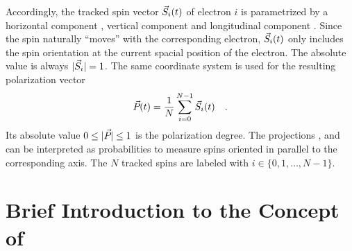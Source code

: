 \documentclass[a4paper]{scrartcl}
\begin{document}
Accordingly, the tracked spin vector $\svec[i](t)$ of electron $i$ is parametrized by a horizontal
component \sx, vertical component \sz and longitudinal component \slong. Since the spin
naturally \enquote{moves} with the corresponding electron, $\svec[i](t)$ only
includes the spin orientation at the current spacial position of the electron. The
absolute value is always $|\svec[i]| = 1$.
%
The same coordinate system is used for the resulting polarization vector
\begin{equation*}
\pvec(t) = \frac{1}{N} \sum_{i=0}^{N-1} \svec[i](t) \quad.
\end{equation*}
Its absolute value $0\leq\pabs\leq 1$ is the polarization degree. The projections \px, \pz
and \plong can be interpreted as probabilities to measure spins oriented in parallel to
the corresponding axis.
%
The $N$ tracked spins are labeled with $i\in \{0,1,\dots,N-1\}$.




\section{Brief Introduction to the Concept of \polem}
\label{sec:brief-intr}
\end{document}
